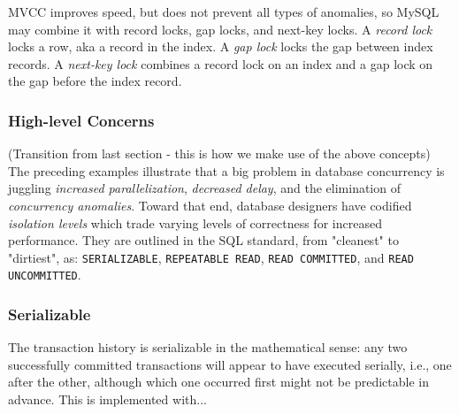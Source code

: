 \documentclass[12pt]{article} %
\begin{document}
MVCC improves speed, but does not prevent all types of anomalies, so MySQL may combine it with record locks, gap locks, and next-key locks. A \textit{record lock} locks a row, aka a record in the index. A \textit{gap lock} locks the gap between index records. A \textit{next-key lock} combines a record lock on an index and a gap lock on the gap before the index record.

\subsubsection{High-level Concerns}
(Transition from last section - this is how we make use of the above concepts)
The preceding examples illustrate that a big problem in database concurrency is juggling \textit{increased parallelization}, \textit{decreased delay}, and the elimination of \textit{concurrency anomalies}. Toward that end, database designers have codified \textit{isolation levels} which trade varying levels of correctness for increased performance. They are outlined in the SQL standard, from "cleanest" to "dirtiest", as: \texttt{SERIALIZABLE}, \texttt{REPEATABLE READ}, \texttt{READ COMMITTED}, and \texttt{READ UNCOMMITTED}.


\subsubsection{Serializable}
The transaction history is serializable in the mathematical sense: any two successfully committed transactions will appear to have executed serially, i.e., one after the other, although which one occurred first might not be predictable in advance. This is implemented with...
\end{document}
